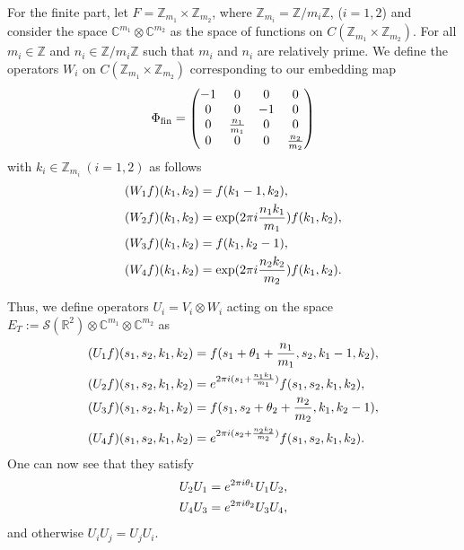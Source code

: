 \documentclass[12pt, a4paper]{article}
\newcommand{\Z}{{\mathbb Z}}
\newcommand{\C}{{\mathbb C}}
\begin{document}
For the finite part, let $F={\Z}_{m_1}\times{\Z}_{m_2}$, where
${\Z}_{m_i}={\Z}/m_i{\Z}$, ($i=1,2$) and consider the space
${\C}^{m_1}\otimes{\C}^{m_2}$ as the space of functions on
$C({\Z}_{m_1}\times{\Z}_{m_2})$. For all $m_i\in {\Z}$ and $n_i\in
{\Z}/m_i{\Z}$ such that $m_i$ and $n_i$ are relatively prime.
%
We define the operators $W_i$ on $C({\Z}_{m_1}\times{\Z}_{m_2})$
corresponding to our embedding map
%
\begin{align}\label{phif}
\Phi_{\rm fin}=\begin{pmatrix} -1&0&0&0\\
                0&0&-1&0\\
                0& \frac{n_1}{m_1}&0&0\\
                0&0&0& \frac{n_2}{m_2}\end{pmatrix}
\end{align}
with $ k_i \in \Z_{m_i} \ (i=1,2) $ as follows
\begin{align}
(W_1f)(k_1,k_2)&=f(k_1-1,k_2), \nonumber\\
(W_2f)(k_1,k_2)&=\exp(2\pi i \frac{n_1 k_1}{m_1})f(k_1,k_2), \nonumber\\
(W_3f)(k_1,k_2)&=f(k_1,k_2-1), \notag\\
(W_4f)(k_1,k_2)&=\exp(2 \pi i
\frac{n_2k_2}{m_2})f(k_1,k_2).\nonumber
\end{align}

Thus, we define operators $U_i=V_i\otimes W_i$ acting on the space
$E_{T}:={\mathcal S}({\mathbb R}^2)\otimes {\mathbb
C}^{m_1}\otimes{\C}^{m_2}$ as
\begin{align} \label{uopr}
(U_1f)(s_1,s_2,k_1,k_2)&=
                 f(s_1  + \theta_1 + \frac{n_1}{m_1},s_2,k_1-1,k_2), \notag \\
(U_2f)(s_1,s_2,k_1,k_2)&=e^{2\pi i(s_1 + \frac{n_1 k_1}{m_1} )}
                 f(s_1,s_2,k_1,k_2), \notag \\
(U_3f)(s_1,s_2,k_1,k_2)&=
                 f(s_1,s_2 + \theta_2 + \frac{n_2}{m_2},k_1,k_2-1), \notag \\
(U_4f)(s_1,s_2,k_1,k_2)&=e^{2\pi i(s_2 + \frac{n_2 k_2}{m_2} )}
                 f(s_1,s_2,k_1,k_2) .
\end{align}
One can now see that they satisfy
\begin{align} \label{Ucomm}
U_2U_1 &=e^{2\pi i \theta_1}U_1U_2, \notag \\
U_4U_3 &=e^{2\pi i \theta_2}U_3U_4,
\end{align}
%
and otherwise $U_i U_j = U_j U_i $.
\end{document}
